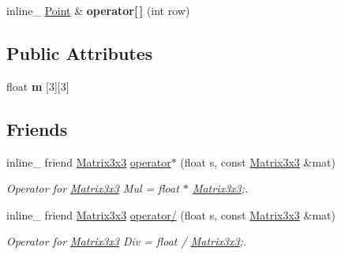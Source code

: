 \begin{DoxyCompactItemize}
\item 
inline\+\_\+ \hyperlink{classOpcode_1_1Point}{Point} \& {\bfseries operator\mbox{[}$\,$\mbox{]}} (int row)\hypertarget{classOpcode_1_1Matrix3x3_a9a5d7695ae1cc05ed8d2403bd37b61b2}{}\label{classOpcode_1_1Matrix3x3_a9a5d7695ae1cc05ed8d2403bd37b61b2}

\end{DoxyCompactItemize}
\subsection*{Public Attributes}
\begin{DoxyCompactItemize}
\item 
float {\bfseries m} \mbox{[}3\mbox{]}\mbox{[}3\mbox{]}\hypertarget{classOpcode_1_1Matrix3x3_a7ab48ecd864f60ffc068122fd7494117}{}\label{classOpcode_1_1Matrix3x3_a7ab48ecd864f60ffc068122fd7494117}

\end{DoxyCompactItemize}
\subsection*{Friends}
\begin{DoxyCompactItemize}
\item 
inline\+\_\+ friend \hyperlink{classOpcode_1_1Matrix3x3}{Matrix3x3} \hyperlink{classOpcode_1_1Matrix3x3_a54e4cff7dc37c73de3e3d0235ad36271}{operator$\ast$} (float s, const \hyperlink{classOpcode_1_1Matrix3x3}{Matrix3x3} \&mat)\hypertarget{classOpcode_1_1Matrix3x3_a54e4cff7dc37c73de3e3d0235ad36271}{}\label{classOpcode_1_1Matrix3x3_a54e4cff7dc37c73de3e3d0235ad36271}

\begin{DoxyCompactList}\small\item\em Operator for \hyperlink{classOpcode_1_1Matrix3x3}{Matrix3x3} Mul = float $\ast$ \hyperlink{classOpcode_1_1Matrix3x3}{Matrix3x3};. \end{DoxyCompactList}\item 
inline\+\_\+ friend \hyperlink{classOpcode_1_1Matrix3x3}{Matrix3x3} \hyperlink{classOpcode_1_1Matrix3x3_a639deffb8c0b2003b65c9e7ad3c5e907}{operator/} (float s, const \hyperlink{classOpcode_1_1Matrix3x3}{Matrix3x3} \&mat)\hypertarget{classOpcode_1_1Matrix3x3_a639deffb8c0b2003b65c9e7ad3c5e907}{}\label{classOpcode_1_1Matrix3x3_a639deffb8c0b2003b65c9e7ad3c5e907}

\begin{DoxyCompactList}\small\item\em Operator for \hyperlink{classOpcode_1_1Matrix3x3}{Matrix3x3} Div = float / \hyperlink{classOpcode_1_1Matrix3x3}{Matrix3x3};. \end{DoxyCompactList}\end{DoxyCompactItemize}


